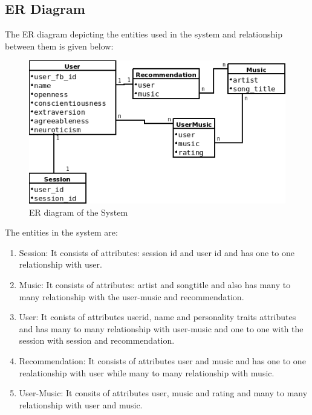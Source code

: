 \subsection{ER Diagram}
The  ER diagram depicting the entities used in the system and relationship between them is given below:
\begin{figure}[!ht]
\centering
\includegraphics[width = 15 cm]{fig/er.png}
\caption{ER diagram of the System}
\label{fig:er}
\end{figure}
The entities in the system are:
\begin{enumerate}
	\item Session: It consists of attributes: session id and user id and has one to one relationship with user.
	\item Music: It consists of attributes: artist and songtitle and also has  many to many relationship with the user-music and recommendation. 
	\item User: It conists of attributes userid, name and personality traits attributes and has  many to  many relationship with user-music and one to one with the session with session and recommendation. 
	\item Recommendation: It consists of attributes user and music and has one to one realationship with user while many to many relationship with music.
	
	\item User-Music: It consits of attributes user, music and rating and many to many relationship with user and music. 
\end{enumerate}
\newpage
